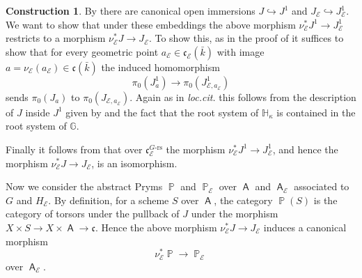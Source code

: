 \documentclass{article}
\DeclareMathOperator{\A}{\mathsf{A}}
\DeclareMathOperator{\Pb}{\mathbb{P}}
\newcommand{\BG}{{\mathbb{G}}}
\newcommand{\BH}{{\mathbb{H}}}
\newcommand{\CE}{{\mathcal E}}
\let\into\hookrightarrow
\theoremstyle{definition}
\newtheorem{construction}[definition]{Construction}
\theoremstyle{plain}
\begin{document}
\begin{construction}
By \cite[Proposition 2.4.7]{MR2653248} there are canonical open immersions $J \into J^1$ and $J_\CE \into J^1_\CE$. We want to show that under these embeddings the above morphism $\nu_\CE^* J^1 \to J^1_\CE$ restricts to a morphism $\nu_\CE^*J \to J_\CE$. To show this, as in the proof of \cite[Proposition 2.5.1]{MR2653248} it suffices to show that for every geometric point $a_\CE \in \mathfrak{c}_\CE(\bar k)$ with image $a=\nu_\CE(a_\CE) \in \mathfrak{c}(\bar k)$ the induced homomorphism 
\begin{equation*}
  \pi_0(J^1_a) \to \pi_0(J^1_{\CE,a_\CE})
\end{equation*}
sends $\pi_0(J_a)$ to $\pi_0(J_{\CE,a_\CE})$. Again as in \emph{loc.cit.} this follows from the description of $J$ inside $J^1$ given by \cite[Definition 2.4.5]{MR2653248} and the fact that the root system of $\BH_\kappa$ is contained in the root system of $\BG$.

Finally it follows from \cite[Lemma 1.9.2]{MR2653248} that over $\mathfrak{c}_\CE^{\text{$G$-rs}}$ the morphism $\nu_\CE^*J^1 \to J^1_\CE$, and hence the morphism $\nu_\CE^* J \to J_\CE$, is an isomorphism.

Now we consider the abstract Pryms $\Pb$ and $\Pb_\CE$ over $\A$ and $\A_\CE$ associated to $G$ and $H_\CE$. By definition, for a scheme $S$ over $\A$, the category $\Pb(S)$ is the category of torsors under the pullback of $J$ under the morphism $X \times S \to X \times \A \to \mathfrak{c}$. Hence the above morphism $\nu_\CE^* J \to J_\CE$ induces a canonical morphism
\begin{equation} \label{PFunc}
  \nu_\CE^* \Pb \to \Pb_\CE
\end{equation}
over $\A_\CE$.
\end{construction}
\end{document}
